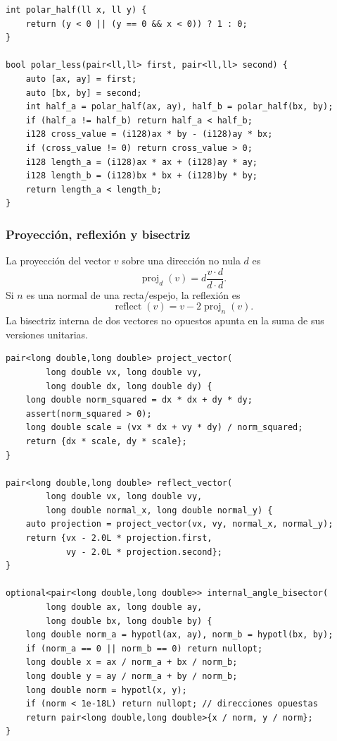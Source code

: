 \begin{lstlisting}[style=cpp]
int polar_half(ll x, ll y) {
    return (y < 0 || (y == 0 && x < 0)) ? 1 : 0;
}

bool polar_less(pair<ll,ll> first, pair<ll,ll> second) {
    auto [ax, ay] = first;
    auto [bx, by] = second;
    int half_a = polar_half(ax, ay), half_b = polar_half(bx, by);
    if (half_a != half_b) return half_a < half_b;
    i128 cross_value = (i128)ax * by - (i128)ay * bx;
    if (cross_value != 0) return cross_value > 0;
    i128 length_a = (i128)ax * ax + (i128)ay * ay;
    i128 length_b = (i128)bx * bx + (i128)by * by;
    return length_a < length_b;
}
\end{lstlisting}


\subsubsection{Proyecci\'on, reflexi\'on y bisectriz}

La proyecci\'on del vector $v$ sobre una direcci\'on no nula $d$ es
\[
\operatorname{proj}_d(v)=d\frac{v\cdot d}{d\cdot d}.
\]
Si $n$ es una normal de una recta/espejo, la reflexi\'on es
\[
\operatorname{reflect}(v)=v-2\operatorname{proj}_n(v).
\]
La bisectriz interna de dos vectores no opuestos apunta en la suma de sus
versiones unitarias.

\begin{lstlisting}[style=cpp]
pair<long double,long double> project_vector(
        long double vx, long double vy,
        long double dx, long double dy) {
    long double norm_squared = dx * dx + dy * dy;
    assert(norm_squared > 0);
    long double scale = (vx * dx + vy * dy) / norm_squared;
    return {dx * scale, dy * scale};
}

pair<long double,long double> reflect_vector(
        long double vx, long double vy,
        long double normal_x, long double normal_y) {
    auto projection = project_vector(vx, vy, normal_x, normal_y);
    return {vx - 2.0L * projection.first,
            vy - 2.0L * projection.second};
}

optional<pair<long double,long double>> internal_angle_bisector(
        long double ax, long double ay,
        long double bx, long double by) {
    long double norm_a = hypotl(ax, ay), norm_b = hypotl(bx, by);
    if (norm_a == 0 || norm_b == 0) return nullopt;
    long double x = ax / norm_a + bx / norm_b;
    long double y = ay / norm_a + by / norm_b;
    long double norm = hypotl(x, y);
    if (norm < 1e-18L) return nullopt; // direcciones opuestas
    return pair<long double,long double>{x / norm, y / norm};
}
\end{lstlisting}

